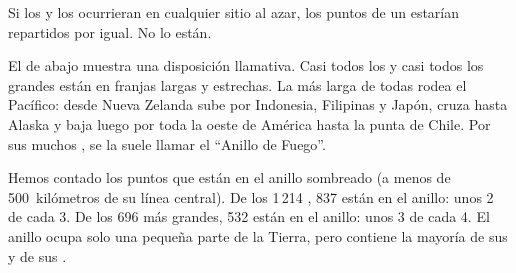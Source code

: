 Si los  y los  ocurrieran en cualquier sitio al azar, los
puntos de un  estarían repartidos por igual. No lo están.

El  de abajo muestra una disposición llamativa. Casi todos los 
y casi todos los grandes  están en franjas largas y estrechas.
La más larga de todas rodea el  Pacífico: desde Nueva Zelanda sube
por Indonesia, Filipinas y Japón, cruza hasta Alaska y baja luego por toda
la  oeste de América hasta la punta de Chile. Por sus muchos ,
se la suele llamar el ``Anillo de Fuego''.

\begin{example}\label{ex:g4:volcanoes-earthquakes-first-look:shares}
Hemos contado los puntos que están en el anillo sombreado (a menos de
500~kilómetros de su línea central). De los 1\,214 , 837 están en el
anillo: unos 2 de cada 3. De los 696  más grandes, 532 están en el
anillo: unos 3 de cada 4. El anillo ocupa solo una pequeña parte de la
Tierra, pero contiene la mayoría de sus  y de sus .
\end{example}

